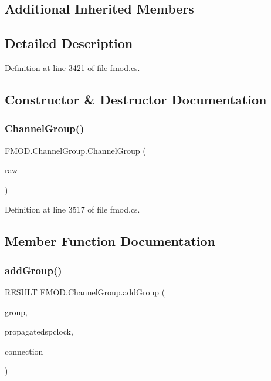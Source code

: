 \subsection*{Additional Inherited Members}


\subsection{Detailed Description}


Definition at line 3421 of file fmod.\+cs.



\subsection{Constructor \& Destructor Documentation}
\mbox{\label{class_f_m_o_d_1_1_channel_group_a27ea067b85feb35e8ede85a74e88a52f}} 
\subsubsection{\texorpdfstring{Channel\+Group()}{ChannelGroup()}}
{\footnotesize\ttfamily F\+M\+O\+D.\+Channel\+Group.\+Channel\+Group (\begin{DoxyParamCaption}\item[{Int\+Ptr}]{raw }\end{DoxyParamCaption})}



Definition at line 3517 of file fmod.\+cs.



\subsection{Member Function Documentation}
\mbox{\label{class_f_m_o_d_1_1_channel_group_a4d96176a8c0c2444957941ae55bf0001}} 
\subsubsection{\texorpdfstring{add\+Group()}{addGroup()}}
{\footnotesize\ttfamily \hyperlink{namespace_f_m_o_d_a305d1176ef3f8c8815861a60407ac33d}{R\+E\+S\+U\+LT} F\+M\+O\+D.\+Channel\+Group.\+add\+Group (\begin{DoxyParamCaption}\item[{\hyperlink{class_f_m_o_d_1_1_channel_group}{Channel\+Group}}]{group,  }\item[{bool}]{propagatedspclock,  }\item[{out \hyperlink{class_f_m_o_d_1_1_d_s_p_connection}{D\+S\+P\+Connection}}]{connection }\end{DoxyParamCaption})}



